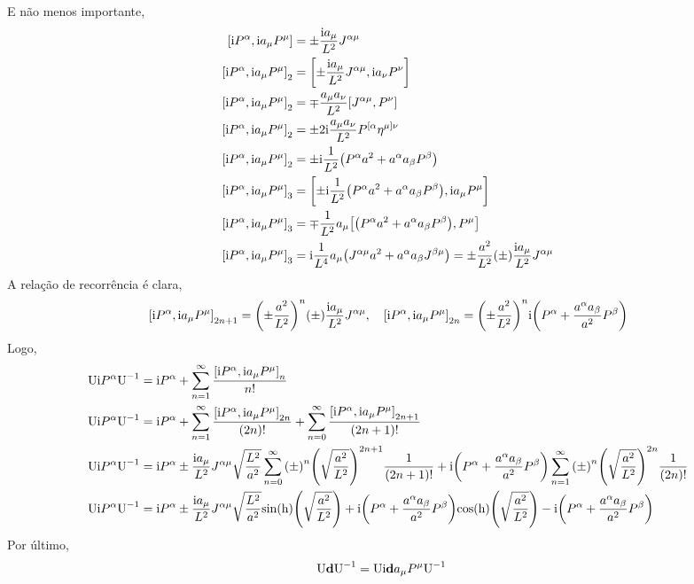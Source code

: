 E não menos importante,
\begin{align*}
    \comm{\im P^\alpha}{\im a_\mu P^\mu}&=\pm\frac{\im a_\mu}{L^2}J^{\alpha\mu}\\
    \comm{\im P^\alpha}{\im a_\mu P^\mu}_2&=\comm{\pm\frac{\im a_\mu}{L^2}J^{\alpha\mu}}{\im a_\nu P^\nu}\\
    \comm{\im P^\alpha}{\im a_\mu P^\mu}_2&=\mp\frac{ a_\mu a_\nu}{L^2}\comm{J^{\alpha\mu}}{  P^\nu}\\
    \comm{\im P^\alpha}{\im a_\mu P^\mu}_2&=\pm2\im\frac{ a_\mu a_\nu}{L^2}P^{[\alpha}\eta^{\mu]\nu}\\
    \comm{\im P^\alpha}{\im a_\mu P^\mu}_2&=\pm\im\frac{ 1}{L^2}\qty(P^{\alpha}a^2+a^\alpha a_\beta P^\beta)\\
    \comm{\im P^\alpha}{\im a_\mu P^\mu}_3&=\comm{\pm\im\frac{ 1}{L^2}\qty(P^{\alpha}a^2+a^\alpha a_\beta P^\beta)}{\im a_\mu P^\mu}\\
    \comm{\im P^\alpha}{\im a_\mu P^\mu}_3&=\mp\frac{ 1}{L^2}a_\mu \comm{\qty(P^{\alpha}a^2+a^\alpha a_\beta P^\beta)}{ P^\mu}\\
    \comm{\im P^\alpha}{\im a_\mu P^\mu}_3&=\im\frac{ 1}{L^4}a_\mu \qty(J^{\alpha\mu}a^2+a^\alpha a_\beta J^{\beta\mu})=\pm\frac{ a^2}{L^2}\qty(\pm)\frac{\im a_\mu}{L^2} J^{\alpha\mu}
\end{align*}
A relação de recorrência é clara,
\[\comm{\im P^\alpha}{\im a_\mu P^\mu}_{2n+1}=\qty(\pm\frac{a^2}{L^2})^n\qty(\pm)\frac{\im a_\mu}{L^2}J^{\alpha\mu},\ \ \ \comm{\im P^\alpha}{\im a_\mu P^\mu}_{2n}=\qty(\pm\frac{a^2}{L^2})^{n}\im\qty(P^{\alpha}+\frac{a^\alpha a_\beta}{a^2} P^\beta)\]
Logo,
\begin{align*}
    \textnormal U\im P^\alpha\textnormal U^{-1}&=\im P^\alpha+\sum\limits_{n=1}^\infty \frac{\comm{\im P^\alpha}{\im a_\mu P^\mu}_{n}}{n!}\\
    \textnormal U\im P^\alpha\textnormal U^{-1}&=\im P^\alpha+\sum\limits_{n=1}^\infty \frac{\comm{\im  P^\alpha}{\im a_\mu P^\mu}_{2n}}{(2n)!}+\sum\limits_{n=0}^\infty \frac{\comm{\im P^\alpha}{\im a_\mu P^\mu}_{2n+1}}{(2n+1)!}\\
    \textnormal U\im P^\alpha\textnormal U^{-1}&=\im P^\alpha\pm\frac{\im a_\mu}{L^2}J^{\alpha\mu}\sqrt{\frac{L^2}{a^2}}\sum\limits_{n=0}^\infty\qty(\pm)^n\qty(\sqrt{\frac{a^2}{L^2}})^{2n+1} \frac{1}{(2n+1)!}+\im \qty(P^{\alpha}+\frac{a^\alpha a_\beta}{a^2} P^\beta)\sum\limits_{n=1}^\infty\qty(\pm)^n\qty(\sqrt{\frac{a^2}{L^2}})^{2n} \frac{1}{(2n)!}\\
    \textnormal U\im P^\alpha\textnormal U^{-1}&=\im P^\alpha\pm\frac{\im a_\mu}{L^2}J^{\alpha\mu}\sqrt{\frac{L^2}{a^2}}\textnormal{sin(h)}\qty(\sqrt{\frac{a^2}{L^2}})+\im \qty(P^{\alpha}+\frac{a^\alpha a_\beta}{a^2} P^\beta)\textnormal{cos(h)}\qty(\sqrt{\frac{a^2}{L^2}})-\im \qty(P^{\alpha}+\frac{a^\alpha a_\beta}{a^2} P^\beta)
\end{align*}
Por último,
\begin{align*}
    \textnormal U\vb d\textnormal U^{-1}&=\textnormal U\textnormal{i}\vb d a_\mu P^\mu\textnormal U^{-1}
\end{align*}